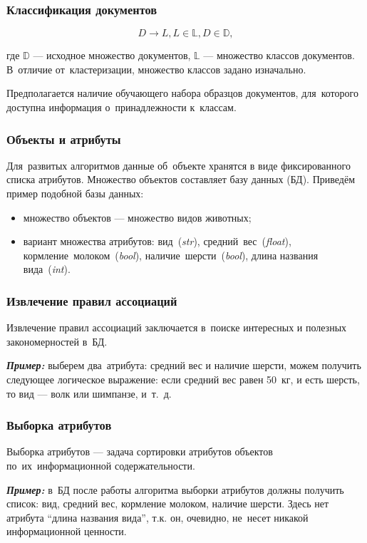 \documentclass{beamer}
\newcommand{\MARK}[1]{{\bf {\it #1}}}
\begin{document}
\begin{frame}
\frametitle{Классификация документов}
$$D \to L, L \in \mathbb{L}, D \in \mathbb{D},$$

\vspace{1cm}

где $\mathbb{D}$ --- исходное множество документов, 
$\mathbb{L}$ --- множество классов документов.
В~отличие от~кластеризации, множество классов задано изначально.

\vspace{5mm}

Предполагается наличие обучающего набора образцов документов, 
для~которого доступна информация о~принадлежности к~классам.
\end{frame}

\begin{frame}
\frametitle{Объекты и атрибуты}

Для~развитых алгоритмов данные  об~объекте хранятся в виде фиксированного списка атрибутов.
Множество объектов составляет базу данных (БД).
Приведём пример подобной базы данных:

\begin{itemize}
\item {множество объектов --- множество видов животных;}
\vspace{1cm}
\item {вариант множества атрибутов:
вид~({\it str}),
средний~вес~({\it float}),
кормление~молоком~({\it bool}),
 наличие~шерсти~({\it bool}),
длина названия вида~({\it int}).
}
\end{itemize}
\end{frame}

\begin{frame}
\frametitle{Извлечение правил ассоциаций}

Извлечение правил ассоциаций заключается в~поиске интересных и полезных закономерностей в~БД.

\vspace{1cm}

\MARK{Пример:}
выберем два~атрибута: средний вес и наличие шерсти,
можем получить следующее логическое выражение:
если средний вес равен 50~кг, и есть шерсть, то вид --- волк или шимпанзе, и~т.~д.
\end{frame}

\begin{frame}
\frametitle{Выборка атрибутов}
Выборка атрибутов --- задача сортировки атрибутов объектов по~их~информационной содержательности.

\vspace{1cm}

\MARK{Пример:}
в~БД после работы алгоритма выборки атрибутов должны получить список:
вид,
средний вес,
кормление молоком,
наличие шерсти.
Здесь нет атрибута ``длина названия вида'',
т.к. он, очевидно, не~несет никакой информационной ценности.
\end{frame}
\end{document}
